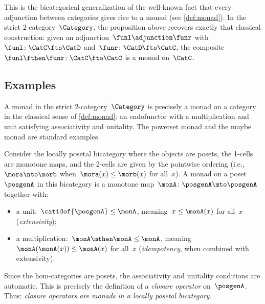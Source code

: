 \begin{remark}
    This is the bicategorical generalization of the well-known fact that every adjunction between categories gives rise to a monad (see \cref{def:monad}).
    In the strict 2-category~$\Category$, the proposition above recovers exactly that classical construction: given an adjunction~$\funl \adjunction \funr$ with~$\funl \colon \CatC \fto \CatD$ and~$\funr \colon \CatD \fto \CatC$, the composite~$\funl \fthen \funr \colon \CatC \fto \CatC$ is a monad on~$\CatC$.
\end{remark}

\subsection{Examples}

\begin{example}
    \label{exa:bicat-monad-cat}
    A monad in the strict 2-category~$\Category$ is precisely a monad on a category in the classical sense of \cref{def:monad}: an endofunctor with a multiplication and unit satisfying associativity and unitality.
    The powerset monad and the maybe monad are standard examples.
\end{example}

\begin{example}
    \label{exa:bicat-monad-closure}
    Consider the locally posetal bicategory where the objects are posets, the 1-cells are monotone maps, and the 2-cells are given by the pointwise ordering (i.e., $\mora \nto \morb$ when~$\mora(x) \leq \morb(x)$ for all~$x$).
    A monad on a poset~$\posgenA$ in this bicategory is a monotone map~$\monA \colon \posgenA \mto \posgenA$ together with:
    \begin{itemize}
        \item a unit:~$\catidof{\posgenA} \leq \monA$, meaning~$x \leq \monA(x)$ for all~$x$ (\emph{extensivity});
        \item a multiplication:~$\monA \mthen \monA \leq \monA$, meaning~$\monA(\monA(x)) \leq \monA(x)$ for all~$x$ (\emph{idempotency}, when combined with extensivity).
    \end{itemize}
    Since the hom-categories are posets, the associativity and unitality conditions are automatic.
    This is precisely the definition of a \emph{closure operator} on~$\posgenA$.
    Thus: \emph{closure operators are monads in a locally posetal bicategory}.
\end{example}

